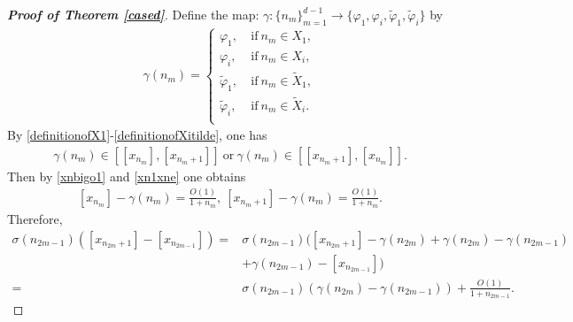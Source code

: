 \documentclass[12pt]{amsart}
\theoremstyle{plain}
\theoremstyle{definition}
\begin{document}
\begin{proof}[\textbf{Proof of Theorem \ref{cased}}]
Define the map: $\gamma:\{n_m\}_{m=1}^{d-1}\to \{\varphi_1,\varphi_i,\tilde{\varphi}_1,\tilde{\varphi}_i\}$ by 
\begin{align}
\gamma(n_{m})=\begin{cases}
\varphi_1,&\mathrm{\ if \ }n_m\in X_1,\\
\varphi_i,&\mathrm{\ if \ }n_m\in X_i,\\
\tilde{\varphi}_1,&\mathrm{\ if \ }n_m\in \tilde{X}_1,\\
\tilde{\varphi}_i,&\mathrm{\ if \ }n_m\in \tilde{X}_i.\\
\end{cases}\nonumber
\end{align}
By \eqref{definitionofX1}-\eqref{definitionofXitilde}, one has
\begin{align}
\gamma(n_m)\in [\left[x_{n_m}\right],\left[x_{n_{m}+1}\right]] \ \mathrm{or}\ \gamma(n_m)\in [\left[x_{n_m+1}\right],\left[x_{n_{m}}\right]].\nonumber
\end{align}
Then by \eqref{xnbigo1} and \eqref{xn1xne} one obtains 
\begin{align}
{\left[x_{n_m}\right]-\gamma(n_m)}= \frac{O(1)}{1+n_m},\
 {\left[x_{n_m+1}\right]-\gamma(n_m)}= \frac{O(1)}{1+n_m}.\nonumber
\end{align}
Therefore,
\begin{align}
\sigma(n_{2m-1})(\left[x_{n_{2m}+1}\right]-\left[x_{n_{2m-1}}\right])=&\sigma(n_{2m-1})(\left[x_{n_{2m}+1}\right]-\gamma(n_{2m})+\gamma(n_{2m})-\gamma(n_{2m-1})\nonumber\\
&+\gamma(n_{2m-1})-\left[x_{n_{2m-1}}\right])\nonumber\\
=&\sigma(n_{2m-1})(\gamma(n_{2m})-\gamma(n_{2m-1}))+\frac{O(1)}{1+{n_{2m-1}}}.\label{sigmaeachpart}
\end{align}


\end{proof}
\end{document}
